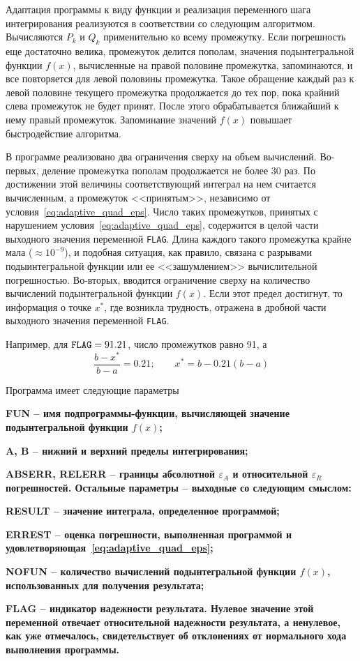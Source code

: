 \documentclass[../../calc-math-exam-2023.tex]{subfiles}
\begin{document}
    Адаптация программы к виду функции и реализация переменного шага интегрирования
    реализуются в соответствии со следующим алгоритмом. Вычисляются $P_k$ и $Q_k$
    применительно ко всему промежутку. Если погрешность еще достаточно велика,
    промежуток делится пополам, значения подынтегральной функции $f(x)$,
    вычисленные на правой половине промежутка, запоминаются, и все повторяется
    для левой половины промежутка. Такое обращение каждый раз к левой половине
    текущего промежутка продолжается до тех пор, пока крайний слева промежуток не
    будет принят. После этого обрабатывается ближайший к нему правый промежуток.
    Запоминание значений $f(x)$ повышает быстродействие алгоритма.

    В программе реализовано два ограничения сверху на объем вычислений. Во-первых,
    деление промежутка пополам продолжается не более 30 раз. По достижении этой
    величины соответствующий интеграл на нем считается вычисленным, а промежуток
    <<принятым>>, независимо от условия~\eqref{eq:adaptive_quad_eps}. Число таких
    промежутков, принятых с нарушением условия~\eqref{eq:adaptive_quad_eps},
    содержится в целой части выходного значения переменной \verb|FLAG|. Длина
    каждого такого промежутка крайне мала ($\displaystyle \approx 10^{-9}$), и подобная ситуация,
    как правило, связана с разрывами подыинтегральной функции или ее <<зашумлением>>
    вычислительной погрешностью. Во-вторых, вводится ограничение сверху на
    количество вычислений подынтегральной функции $f(x)$. Если этот предел достигнут,
    то информация о точке $\displaystyle x^{*}$, где возникла трудность, отражена в
    дробной части выходного значения переменной \verb|FLAG|.

    Например, для $\verb|FLAG| = 91.21$, число промежутков равно 91, а
    \begin{equation*}
        \frac{b-x^{*}}{b-a} = 0.21; \qquad x^{*} = b - 0.21(b-a)
    \end{equation*}

    Программа имеет следующие параметры

    \bf{FUN} -- имя подпрограммы-функции, вычисляющей значение подынтегральной
    функции $f(x)$;

    \bf{A, B} -- нижний и верхний пределы интегрирования;

    \bf{ABSERR, RELERR} -- границы абсолютной $\varepsilon_A$ и относительной
    $\varepsilon_R$ погрешностей. Остальные параметры -- выходные со следующим смыслом:

    \bf{RESULT} -- значение интеграла, определенное программой;

    \bf{ERREST} -- оценка погрешности, выполненная программой и удовлетворяющая~\eqref{eq:adaptive_quad_eps};

    \bf{NOFUN} -- количество вычислений подынтегральной функции $f(x)$, использованных для получения результата;

    \bf{FLAG} -- индикатор надежности результата. Нулевое значение этой переменной отвечает
    относительной надежности результата, а ненулевое, как уже отмечалось, свидетельствует
    об отклонениях от нормального хода выполнения программы.
\end{document}
